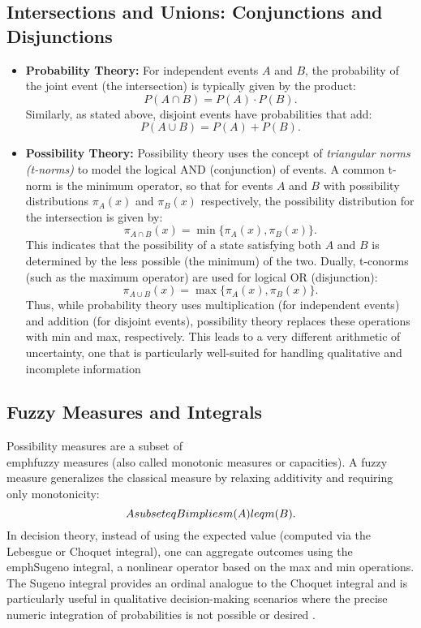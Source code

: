 \documentclass[14pt,a4paper]{report}
\begin{document}
\subsection{Intersections and Unions: Conjunctions and Disjunctions}

\begin{itemize}
  \item \textbf{Probability Theory:}  
  For independent events \(A\) and \(B\), the probability of the joint event (the intersection) is typically given by the product:
  \[
  P(A \cap B) = P(A) \cdot P(B).
  \]
  Similarly, as stated above, disjoint events have probabilities that add:
  \[
  P(A \cup B) = P(A) + P(B).
  \]

  \item \textbf{Possibility Theory:}  
  Possibility theory uses the concept of \emph{triangular norms (t-norms)} to model the logical AND (conjunction) of events. A common t-norm is the minimum operator, so that for events \(A\) and \(B\) with possibility distributions \( \pi_A(x) \) and \( \pi_B(x) \) respectively, the possibility distribution for the intersection is given by:
  \[
  \pi_{A \cap B}(x) = \min\{ \pi_A(x), \pi_B(x) \}.
  \]
  This indicates that the possibility of a state satisfying both \(A\) and \(B\) is determined by the less possible (the minimum) of the two. Dually, t-conorms (such as the maximum operator) are used for logical OR (disjunction):
  \[
  \pi_{A \cup B}(x) = \max\{ \pi_A(x), \pi_B(x) \}.
  \]
  Thus, while probability theory uses multiplication (for independent events) and addition (for disjoint events), possibility theory replaces these operations with min and max, respectively. This leads to a very different arithmetic of uncertainty, one that is particularly well-suited for handling qualitative and incomplete information 
\end{itemize}

\subsection{Fuzzy Measures and Integrals}

Possibility measures are a subset of \\emph{fuzzy measures} (also called monotonic measures or capacities). A fuzzy measure generalizes the classical measure by relaxing additivity and requiring only monotonicity:
\[
A \\subseteq B \\implies m(A) \\leq m(B).
\]
In decision theory, instead of using the expected value (computed via the Lebesgue or Choquet integral), one can aggregate outcomes using the \\emph{Sugeno integral}, a nonlinear operator based on the max and min operations. The Sugeno integral provides an ordinal analogue to the Choquet integral and is particularly useful in qualitative decision-making scenarios where the precise numeric integration of probabilities is not possible or desired \cite{arxiv.org}.
\end{document}
